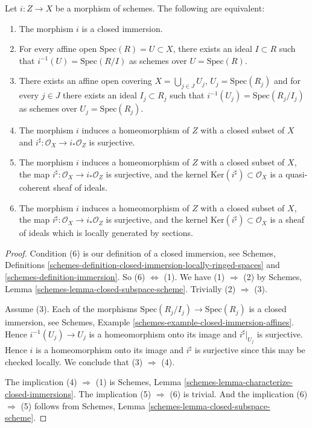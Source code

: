 \begin{lemma}
\label{lemma-closed-immersion}
Let $i : Z \to X$ be a morphism of schemes.
The following are equivalent:
\begin{enumerate}
\item The morphism $i$ is a closed immersion.
\item For every affine open $\text{Spec}(R) = U \subset X$,
there exists an ideal $I \subset R$ such that
$i^{-1}(U) = \text{Spec}(R/I)$ as schemes over $U = \text{Spec}(R)$.
\item There exists an affine open covering $X = \bigcup_{j \in J} U_j$,
$U_j = \text{Spec}(R_j)$ and for every $j \in J$ there exists
an ideal $I_j \subset R_j$ such that
$i^{-1}(U_j) = \text{Spec}(R_j/I_j)$ as schemes over $U_j = \text{Spec}(R_j)$.
\item The morphism $i$ induces a homeomorphism of $Z$ with a closed subset
of $X$ and $i^\sharp : \mathcal{O}_X \to i_*\mathcal{O}_Z$ is surjective.
\item The morphism $i$ induces a homeomorphism of $Z$ with a closed subset
of $X$, the map $i^\sharp : \mathcal{O}_X \to i_*\mathcal{O}_Z$ is surjective,
and the kernel $\text{Ker}(i^\sharp)\subset \mathcal{O}_X$ is a quasi-coherent
sheaf of ideals.
\item The morphism $i$ induces a homeomorphism of $Z$ with a closed subset
of $X$, the map $i^\sharp : \mathcal{O}_X \to i_*\mathcal{O}_Z$ is surjective,
and the kernel $\text{Ker}(i^\sharp)\subset \mathcal{O}_X$ is a
sheaf of ideals which is locally generated by sections.
\end{enumerate}
\end{lemma}

\begin{proof}
Condition (6) is our definition of a closed immersion, see Schemes,
Definitions \ref{schemes-definition-closed-immersion-locally-ringed-spaces}
and \ref{schemes-definition-immersion}.
So (6) $\Leftrightarrow$ (1). We have (1) $\Rightarrow$ (2) by
Schemes, Lemma \ref{schemes-lemma-closed-subspace-scheme}.
Trivially (2) $\Rightarrow$ (3).

\medskip\noindent
Assume (3). Each of the morphisms
$\text{Spec}(R_j/I_j) \to \text{Spec}(R_j)$ is
a closed immersion, see
Schemes, Example \ref{schemes-example-closed-immersion-affines}.
Hence $i^{-1}(U_j) \to U_j$ is a homeomorphism onto its image
and $i^\sharp|_{U_j}$ is surjective. Hence $i$ is a homeomorphism
onto its image and $i^\sharp$ is surjective since this may be
checked locally. We conclude that (3) $\Rightarrow$ (4).

\medskip\noindent
The implication (4) $\Rightarrow$ (1) is
Schemes, Lemma \ref{schemes-lemma-characterize-closed-immersions}.
The implication (5) $\Rightarrow$ (6) is trivial.
And the implication (6) $\Rightarrow$ (5) follows
from Schemes, Lemma \ref{schemes-lemma-closed-subspace-scheme}.
\end{proof}

